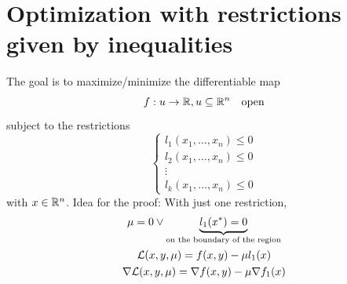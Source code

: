 \section{Optimization with restrictions given by inequalities}

The goal is to maximize/minimize the differentiable map
\begin{equation*}
    f: u\to\mathbb{R}, u\subseteq\mathbb{R}^n \quad \text{open}
\end{equation*}
subject to the restrictions
\begin{equation*}
    \begin{cases*}
        l_1(x_1,\ldots,x_n) \leq 0\\
        l_2(x_1,\ldots,x_n) \leq 0\\
        \vdots\\
        l_k(x_1,\ldots,x_n) \leq 0
    \end{cases*}
\end{equation*}
with $x\in\mathbb{R}^n$.
Idea for the proof: With just one restriction, 
\begin{gather*}
    \mu=0 \lor\underbrace{l_1(x^*)=0}_{\text{on the boundary of the region}}\\
    \mathcal{L}(x,y,\mu) = f(x,y) - \mu l_1(x)\\
    \nabla\mathcal{L}(x,y,\mu) = \nabla f(x,y) - \mu\nabla f_1(x)
\end{gather*}

